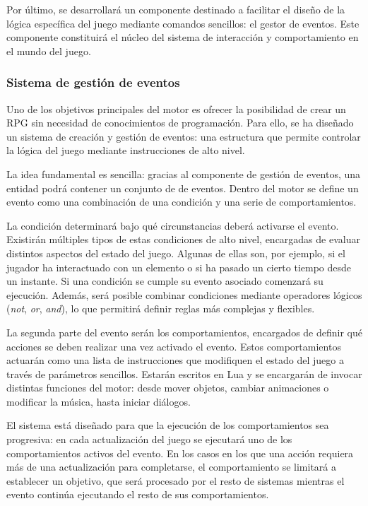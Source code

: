 \medskip

Por último, se desarrollará un componente destinado a facilitar el diseño de la lógica específica del juego mediante comandos sencillos: el gestor de eventos. Este componente constituirá el núcleo del sistema de interacción y comportamiento en el mundo del juego.

\subsubsection{Sistema de gestión de eventos}
Uno de los objetivos principales del motor es ofrecer la posibilidad de crear un RPG sin necesidad de conocimientos de programación. Para ello, se ha diseñado un sistema de creación y gestión de eventos: una estructura que permite controlar la lógica del juego mediante instrucciones de alto nivel.

\medskip

La idea fundamental es sencilla: gracias al componente de gestión de eventos, una entidad podrá contener un conjunto de  de eventos. Dentro del motor se define un evento como una combinación de una condición y una serie de comportamientos.

\medskip

La condición determinará bajo qué circunstancias deberá activarse el evento. Existirán múltiples tipos de estas condiciones de alto nivel, encargadas de evaluar distintos aspectos del estado del juego. Algunas de ellas son, por ejemplo, si el jugador ha interactuado con un elemento o si ha pasado un cierto tiempo desde un instante. Si una condición se cumple su evento asociado comenzará su ejecución. Además, será posible combinar condiciones mediante operadores lógicos (\textit{not}, \textit{or}, \textit{and}), lo que permitirá definir reglas más complejas y flexibles.

\medskip

La segunda parte del evento serán los comportamientos, encargados de definir qué acciones se deben realizar una vez activado el evento. Estos comportamientos actuarán como una lista de instrucciones que modifiquen el estado del juego a través de parámetros sencillos. Estarán escritos en Lua y se encargarán de invocar distintas funciones del motor: desde mover objetos, cambiar animaciones o modificar la música, hasta iniciar diálogos.

\medskip

El sistema está diseñado para que la ejecución de los comportamientos sea progresiva: en cada actualización del juego se ejecutará uno de los comportamientos activos del evento. En los casos en los que una acción requiera más de una actualización para completarse, el comportamiento se limitará a establecer un objetivo, que será procesado por el resto de sistemas mientras el evento continúa ejecutando el resto de sus comportamientos.

